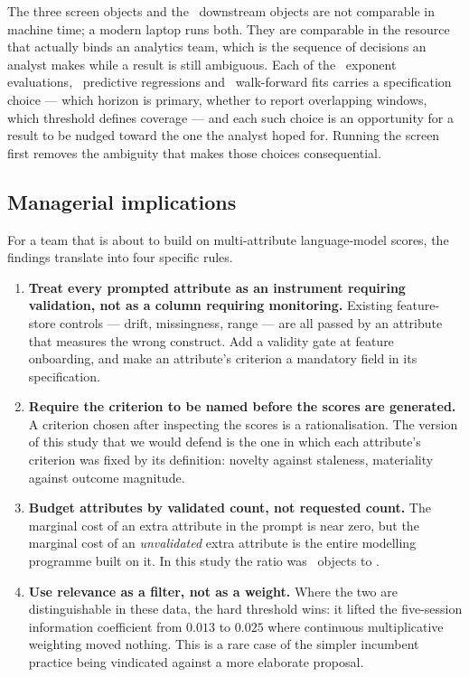 \documentclass[preprint,12pt,authoryear]{elsarticle}
\theoremstyle{plain}
\theoremstyle{remark}
\begin{document}
The three screen objects and the \DownstreamTotal\ downstream objects are not
comparable in machine time; a modern laptop runs both. They are comparable in the
resource that actually binds an analytics team, which is the sequence of
decisions an analyst makes while a result is still ambiguous. Each of the
\GridTotal\ exponent evaluations, \UnivariateFits\ predictive regressions and
\GateFits\ walk-forward fits carries a specification choice --- which horizon is
primary, whether to report overlapping windows, which threshold defines coverage
--- and each such choice is an opportunity for a result to be nudged toward the
one the analyst hoped for. Running the screen first removes the ambiguity that
makes those choices consequential.

\subsection{Managerial implications}\label{sec:managerial}

For a team that is about to build on multi-attribute language-model scores, the
findings translate into four specific rules.

\begin{enumerate}
\item \textbf{Treat every prompted attribute as an instrument requiring
  validation, not as a column requiring monitoring.} Existing feature-store
  controls --- drift, missingness, range --- are all passed by an attribute that
  measures the wrong construct. Add a validity gate at feature onboarding, and
  make an attribute's criterion a mandatory field in its specification.
\item \textbf{Require the criterion to be named before the scores are
  generated.} A criterion chosen after inspecting the scores is a rationalisation.
  The version of this study that we would defend is the one in which each
  attribute's criterion was fixed by its definition: novelty against staleness,
  materiality against outcome magnitude.
\item \textbf{Budget attributes by validated count, not requested count.} The
  marginal cost of an extra attribute in the prompt is near zero, but the
  marginal cost of an \emph{unvalidated} extra attribute is the entire modelling
  programme built on it. In this study the ratio was \ScreenTotal\ objects to
  \DownstreamTotal.
\item \textbf{Use relevance as a filter, not as a weight.} Where the two are
  distinguishable in these data, the hard threshold wins: it lifted the
  five-session information coefficient from $0.013$ to $0.025$ where continuous
  multiplicative weighting moved nothing. This is a rare case of the simpler
  incumbent practice being vindicated against a more elaborate proposal.
\end{enumerate}
\end{document}
